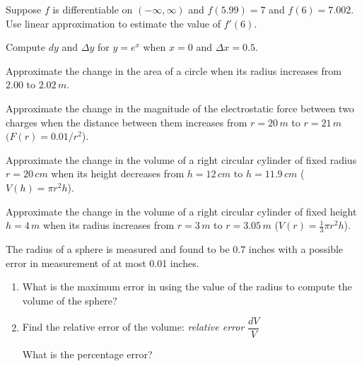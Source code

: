 \documentclass[../mathNotesPreamble]{subfiles}
\begin{document}
\begin{ex*}
  Suppose $f$ is differentiable on $(-\infty,\infty)$ and $f(5.99)=7$ and $f(6)=7.002$. Use linear approximation to estimate the value of $f'(6)$.
\end{ex*}
\pagebreak

\begin{ex*}
  Compute $dy$ and $\Delta y$ for $y=e^x$ when $x=0$ and $\Delta x=0.5$.
\end{ex*}

\begin{ex*}
  Approximate the change in the area of a circle when its radius increases from $2.00$ to $2.02\,m$.
\end{ex*}

\begin{ex*}
  Approximate the change in the magnitude of the electrostatic force between two charges when the distance between them increases from $r=20\,m$ to $r=21\,m$ $(F(r)=0.01/r^2$).
\end{ex*}
\pagebreak

\begin{ex*}
  Approximate the change in the volume of a right circular cylinder of fixed radius $r=20\,cm$ when its height decreases from $h=12\,cm$ to $h=11.9\,cm$ ($V(h)=\pi r^2h$).
\end{ex*}

\begin{ex*}
  Approximate the change in the volume of a right circular cylinder of fixed height $h=4\,m$ when its radius increases from $r=3\,m$ to $r=3.05\,m$ ($V(r)=\frac{1}{3}\pi r^2 h$).
\end{ex*}
\pagebreak

\begin{ex*}
  The radius of a sphere is measured and found to be $0.7$ inches with a possible error in measurement of at most 0.01 inches.
\end{ex*}
\begin{enumerate}[label=\alph*), itemsep=\stretch{1}]
  \item What is the maximum error in using the value of the radius to compute the volume of the sphere?
  \item Find the relative error of the volume: \hfill\textit{relative error} $\dfrac{dV}{V}$\hspace*{50pt}
  
  What is the percentage error?
\end{enumerate}
\pagebreak
\end{document}

